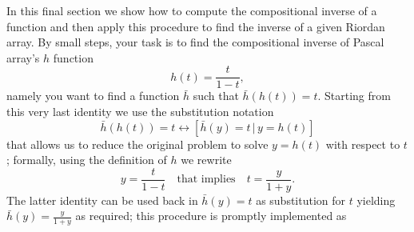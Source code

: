 In this final section we show how to compute the compositional inverse of a
function and then apply this procedure to find the inverse of a given Riordan
array. By small steps, your task is to find the compositional inverse of
Pascal array's $h$ function
\begin{displaymath}
h(t)= \frac{t}{1-t},
\end{displaymath}
namely you want to find a function $\bar{h}$ such that $\bar{h}(h(t))=t$.
Starting from this very last identity we use the substitution notation
\begin{displaymath}
\bar{h}(h(t)) = t \leftrightarrow \left[ \bar{h}(y) = t\, | \, y = h(t) \right]
\end{displaymath}
that allows us to reduce the original problem to solve $y = h(t)$ with respect
to $t$; formally, using the definition of $h$ we rewrite
\begin{displaymath}
y = \frac{t}{1-t} \quad\text{that implies}\quad t = \frac{y}{1+y}.
\end{displaymath}
The latter identity can be used back in $\bar{h}(y) = t$ as substitution for
$t$ yielding $\displaystyle \bar{h}(y)= \frac{y}{1+y} $ as required; this
procedure is promptly implemented as
\inputminted[baselinestretch=0.8,stripnl=false,firstline=212, lastline=229, mathescape=true]
    {python}{deps/simulation-methods/src/sequences.py}
\inputminted[baselinestretch=0.8,stripnl=false,firstline=231, lastline=254, mathescape=true]
    {python}{deps/simulation-methods/src/sequences.py}

